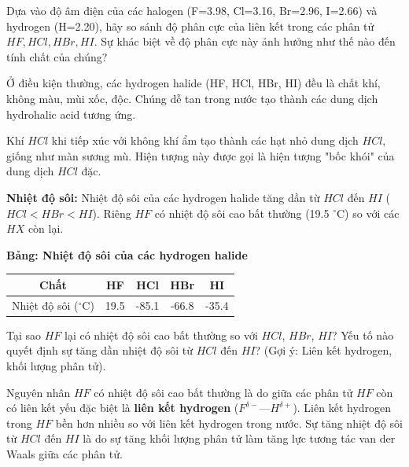 \documentclass[Main.tex]{subfiles}
\begin{document}
	\begin{hoivadap} 
        Dựa vào độ âm điện của các halogen (F=3.98, Cl=3.16, Br=2.96, I=2.66) và hydrogen (H=2.20), hãy so sánh độ phân cực của liên kết trong các phân tử $HF, HCl, HBr, HI$. Sự khác biệt về độ phân cực này ảnh hưởng như thế nào đến tính chất của chúng?
	\end{hoivadap}
	\begin{ghinho}
		Ở điều kiện thường, các hydrogen halide (HF, HCl, HBr, HI) đều là chất khí, không màu, mùi xốc, độc. Chúng dễ tan trong nước tạo thành các dung dịch hydrohalic acid tương ứng.
	\end{ghinho}
    \begin{Bancobiet}
        Khí $HCl$ khi tiếp xúc với không khí ẩm tạo thành các hạt nhỏ dung dịch $HCl$, giống như màn sương mù. Hiện tượng này được gọi là hiện tượng "bốc khói" của dung dịch $HCl$ đặc.
    \end{Bancobiet}
	\begin{tomtat}
		\textbf{Nhiệt độ sôi:} Nhiệt độ sôi của các hydrogen halide tăng dần từ $HCl$ đến $HI$ ($HCl < HBr < HI$). Riêng $HF$ có nhiệt độ sôi cao bất thường (19.5 $^\circ$C) so với các $HX$ còn lại.
	\end{tomtat}

    \begin{center}
		\textbf{Bảng: Nhiệt độ sôi của các hydrogen halide}\\
        \begin{tabular}{|c|c|c|c|c|}
            \hline
            \textbf{Chất} & \textbf{HF} & \textbf{HCl} & \textbf{HBr} & \textbf{HI} \\ 
            \hline
            Nhiệt độ sôi ($^\circ$C) & 19.5 & -85.1 & -66.8 & -35.4 \\
            \hline
        \end{tabular}
    \end{center}
	\begin{hoivadap}
		Tại sao $HF$ lại có nhiệt độ sôi cao bất thường so với $HCl$, $HBr$, $HI$? Yếu tố nào quyết định sự tăng dần nhiệt độ sôi từ $HCl$ đến $HI$? (Gợi ý: Liên kết hydrogen, khối lượng phân tử).
	\end{hoivadap}
	\begin{ghinho}
		Nguyên nhân $HF$ có nhiệt độ sôi cao bất thường là do giữa các phân tử $HF$ còn có liên kết yếu đặc biệt là \textbf{liên kết hydrogen} ($F^{\delta-}$---$H^{\delta+}$). Liên kết hydrogen trong $HF$ bền hơn nhiều so với liên kết hydrogen trong nước.
        Sự tăng nhiệt độ sôi từ $HCl$ đến $HI$ là do sự tăng khối lượng phân tử làm tăng lực tương tác van der Waals giữa các phân tử.
	\end{ghinho}
\end{document}
